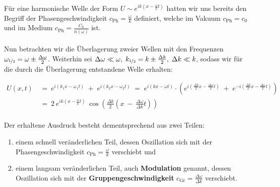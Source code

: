 Für eine harmonische Welle der Form $U \sim e^{ik(x-\frac{\omega}{k}t)}$ hatten wir uns bereits den Begriff der Phasengeschwindigkeit $c_{\text{Ph}} = \frac{\omega}{k}$ definiert, welche im Vakuum $c_{\text{Ph}}=c_0$ und im Medium $c_{\text{Ph}}= \frac{C_0}{n(\omega)}$ ist.\\
\ \\
Nun betrachten wir die Überlagerung zweier Wellen mit den Frequenzen $\omega_{\nicefrac{1}{2}} = \omega \pm \frac{\Delta\omega}{2}$. Weiterhin sei $\Delta\omega\ll\omega, \; k_{\nicefrac{1}{2}} = k \pm \frac{\Delta k}{2}, \; \Delta k \ll k$, sodass wir für die durch die Überlagerung entstandene Welle erhalten:

\begin{align*}
U(x,t) \ &= \ e^{i(k_1 x -\omega_1 t)} \; + \; e^{i(k_2 x - \omega_2 t)} \; = \; e^{i(kx-\omega t)} \cdot \left(e^{i\left(\frac{\Delta k}{2}x - \frac{\Delta \omega}{2}t \right)} \; + \; e^{-i\left(\frac{\Delta k}{2}x - \frac{\Delta \omega}{2}t\right)}\right)\\
&= \ 2 \ e^{ik(x-\frac{\omega}{k} t)} \ \cos\left(\frac{\Delta k}{2}\left(x \ - \ \frac{\Delta \omega}{\Delta k}t\right)\right)
\end{align*}\\

Der erhaltene Ausdruck besteht dementsprechend aus zwei Teilen:\\

\begin{enumerate}
\item einem schnell veränderlichen Teil, dessen Oszillation sich mit der Phasengeschwindigkeit $c_{\text{Ph}} =\frac{\omega}{k}$ verschiebt und

\item einem langsam veränderlichen Teil, auch \textbf{Modulation} genannt, dessen Oszillation sich mit der \textbf{Gruppengeschwindigkeit} $c_{\text{Gr}} = \frac{\Delta \omega}{\Delta k}$ verschiebt.
\end{enumerate}
\newpage

